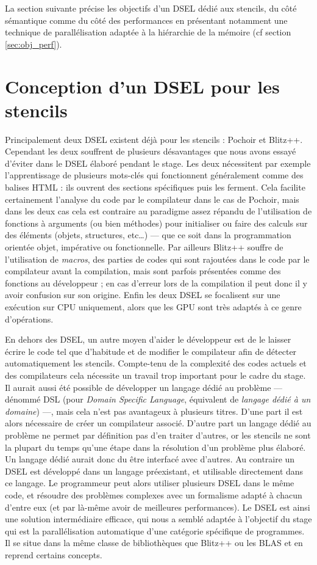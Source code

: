 La section suivante précise les objectifs d'un DSEL dédié aux stencils, du côté sémantique comme du côté des performances en présentant notamment une technique de parallélisation adaptée à la hiérarchie de la mémoire (cf section \ref{sec:obj_perf}).

\section{Conception d'un DSEL pour les stencils}

Principalement deux DSEL existent déjà pour les stencils : \textsf{Pochoir} et \textsf{Blitz++}. Cependant les deux souffrent de plusieurs désavantages que nous avons essayé d'éviter dans le DSEL élaboré pendant le stage. Les deux nécessitent par exemple l'apprentissage de plusieurs mots-clés qui fonctionnent généralement comme des balises HTML : ils ouvrent des sections spécifiques puis les ferment. Cela facilite certainement l'analyse du code par le compilateur dans le cas de \textsf{Pochoir}, mais dans les deux cas cela est contraire au paradigme assez répandu de l'utilisation de fonctions à arguments (ou bien méthodes) pour initialiser ou faire des calculs sur des éléments (objets, structures, etc\ldots) --- que ce soit dans la programmation orientée objet, impérative ou fonctionnelle. Par ailleurs \textsf{Blitz++} souffre de l'utilisation de \emph{macros}, des parties de codes qui sont rajoutées dans le code par le compilateur avant la compilation, mais sont parfois présentées comme des fonctions au développeur ; en cas d'erreur lors de la compilation il peut donc il y avoir confusion sur son origine. Enfin les deux DSEL se focalisent sur une exécution sur CPU uniquement, alors que les GPU sont très adaptés à ce genre d'opérations.

En dehors des DSEL, un autre moyen d'aider le développeur est de le laisser écrire le code tel que d'habitude et de modifier le compilateur afin de détecter automatiquement les stencils. Compte-tenu de la complexité des codes actuels et des compilateurs cela nécessite un travail trop important pour le cadre du stage. Il aurait aussi été possible de développer un langage dédié au problème --- dénommé DSL (pour \emph{Domain Specific Language}, équivalent de \emph{langage dédié à un domaine}) ---, mais cela n'est pas avantageux à plusieurs titres. D'une part il est alors nécessaire de créer un compilateur associé. D'autre part un langage dédié au problème ne permet par définition pas d'en traiter d'autres, or les stencils ne sont la plupart du temps qu'une étape dans la résolution d'un problème plus élaboré. Un langage dédié aurait donc du être interfacé avec d'autres. Au contraire un DSEL est développé dans un langage préexistant, et utilisable directement dans ce langage. Le programmeur peut alors utiliser plusieurs DSEL dans le même code, et résoudre des problèmes complexes avec un formalisme adapté à chacun d'entre eux (et par là-même avoir de meilleures performances). Le DSEL est ainsi une solution intermédiaire efficace, qui nous a semblé adaptée à l'objectif du stage qui est la parallélisation automatique d'une catégorie spécifique de programmes. Il se situe dans la même classe de bibliothèques que \textsf{Blitz++} ou les \textsf{BLAS} et en reprend certains concepts.

